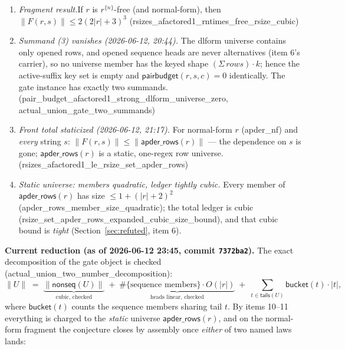\documentclass[11pt]{article}
\theoremstyle{remark}
\newcommand{\rs}[1]{\lvert #1\rvert}                 %
\newcommand{\rss}[1]{\lVert #1\rVert}                %
\newcommand{\Fact}{F}
\newcommand{\tails}{\mathsf{tails}}
\newcommand{\nonseq}{\mathsf{nonseq}}
\newcommand{\pb}{\mathsf{pairbudget}}
\newcommand{\thy}[1]{\textsf{\small #1}}
\begin{document}
\begin{enumerate}
\item \emph{Fragment result.}\;If $r$ is $r^{\{n\}}$-free (and
normal-form), then $\rss{\Fact(r,s)}\le 2(2\rs{r}+3)^{3}$
\hfill(\thy{rsizes\_afactored1\_rntimes\_free\_rsize\_cubic})
\item \emph{Summand (3) vanishes (2026-06-12, 20:44).}  The dlform universe
contains only opened rows, and opened sequence heads are never alternatives
(item 6's carrier), so no universe member has the keyed shape
$(\Sigma\,rows)\cdot k$; hence the active-suffix key set is empty and
$\pb(r,s,c)=0$ identically.  The gate instance has exactly two summands.\\
\mbox{}\hfill(\thy{pair\_budget\_afactored1\_strong\_dlform\_universe\_zero},
\thy{actual\_union\_gate\_two\_summands})
\item \emph{Front total staticized (2026-06-12, 21:17).}  For normal-form
$r$ (\thy{apder\_nf}) and \emph{every} string $s$:
$\rss{\Fact(r,s)}\le\rss{\mathsf{apder\_rows}(r)}$ --- the dependence on $s$
is gone; $\mathsf{apder\_rows}(r)$ is a static, one-regex row universe.\\
\mbox{}\hfill(\thy{rsizes\_afactored1\_le\_rsize\_set\_apder\_rows})
\item \emph{Static universe: members quadratic, ledger tightly cubic.}
Every member of $\mathsf{apder\_rows}(r)$ has size
$\le 1+(\rs{r}+2)^{2}$ (\thy{apder\_rows\_member\_size\_quadratic});
the total ledger is cubic
(\thy{rsize\_set\_apder\_rows\_expanded\_cubic\_size\_bound}), and that
cubic bound is \emph{tight} (Section~\ref{sec:refuted}, item 6).
\end{enumerate}

\noindent
\textbf{Current reduction (as of 2026-06-12 23:45, commit \texttt{7372ba2}).}
The exact decomposition of the gate object is checked
(\thy{actual\_union\_two\_number\_decomposition}):
\[
\rss{U}\;=\;\underbrace{\rss{\nonseq(U)}}_{\text{cubic, checked}}
\;+\;\underbrace{\#\{\text{sequence members}\}\cdot O(\rs{r})}_{\text{heads linear, checked}}
\;+\;\sum_{t\in\tails(U)}\mathsf{bucket}(t)\cdot\rs{t},
\]
where $\mathsf{bucket}(t)$ counts the sequence members sharing tail $t$.
By items 10--11 everything is charged to the \emph{static} universe
$\mathsf{apder\_rows}(r)$, and on the normal-form fragment the conjecture
closes by assembly once \emph{either} of two named laws lands:
\end{document}
